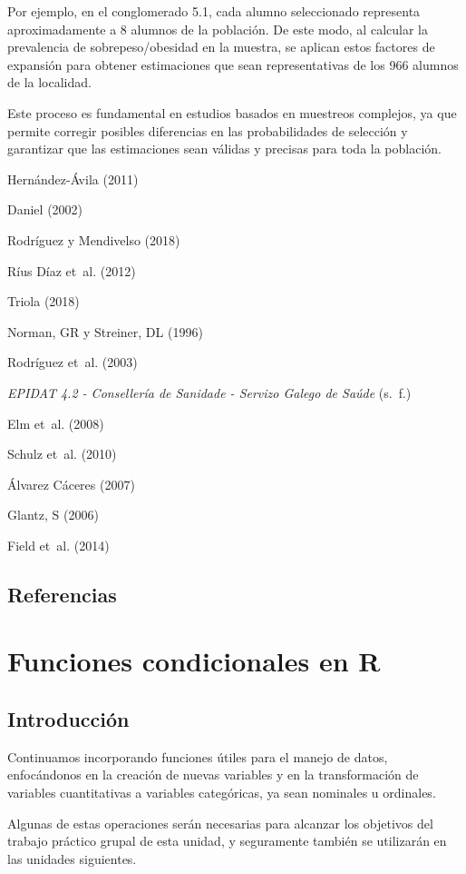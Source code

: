 \documentclass[
  spanish,
  a4paper,
]{scrbook}
\begin{document}
Por ejemplo, en el conglomerado 5.1, cada alumno seleccionado representa
aproximadamente a 8 alumnos de la población. De este modo, al calcular
la prevalencia de sobrepeso/obesidad en la muestra, se aplican estos
factores de expansión para obtener estimaciones que sean representativas
de los 966 alumnos de la localidad.

Este proceso es fundamental en estudios basados en muestreos complejos,
ya que permite corregir posibles diferencias en las probabilidades de
selección y garantizar que las estimaciones sean válidas y precisas para
toda la población.

Hernández-Ávila (2011)

Daniel (2002)

Rodríguez y Mendivelso (2018)

Ríus Díaz et~al. (2012)

Triola (2018)

Norman, GR y Streiner, DL (1996)

Rodríguez et~al. (2003)

\emph{{EPIDAT} 4.2 - {Consellería} de {Sanidade} - {Servizo} {Galego} de
{Saúde}} (s.~f.)

Elm et~al. (2008)

Schulz et~al. (2010)

Álvarez Cáceres (2007)

Glantz, S (2006)

Field et~al. (2014)

\section{Referencias}\label{referencias-8}

\chapter{Funciones condicionales en
R}\label{funciones-condicionales-en-r}

\section{Introducción}\label{introducciuxf3n-8}

Continuamos incorporando funciones útiles para el manejo de datos,
enfocándonos en la creación de nuevas variables y en la transformación
de variables cuantitativas a variables categóricas, ya sean nominales u
ordinales.

Algunas de estas operaciones serán necesarias para alcanzar los
objetivos del trabajo práctico grupal de esta unidad, y seguramente
también se utilizarán en las unidades siguientes.
\end{document}
